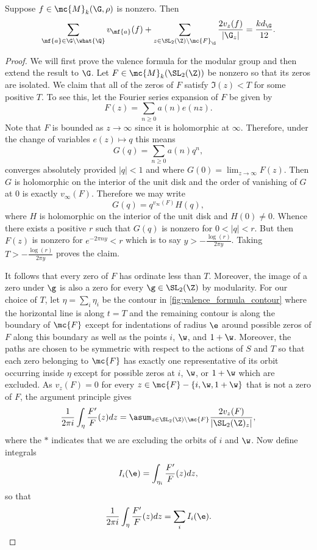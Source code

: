 \documentclass[12pt]{article}
\begin{document}
      \begin{theorem*}
        Suppose \(f \in \mc{M}_{k}(\G,\rho)\) is nonzero. Then
        \[
          \sum_{\mf{a} \in \G\backslash\what{\Q}}v_{\mf{a}}(f)+\sum_{z \in \SL_{2}(\Z)\backslash\mc{F}_{\G}}\frac{2v_{z}(f)}{|\G_{z}|} = \frac{kd_{\G}}{12}.
        \]
      \end{theorem*}
      \begin{proof}
        We will first prove the valence formula for the modular group and then extend the result to \(\G\). Let \(F \in \mc{M}_{k}(\SL_{2}(\Z))\) be nonzero so that its zeros are isolated. We claim that all of the zeros of \(F\) satisfy \(\Im(z) < T\) for some positive \(T\). To see this, let the Fourier series expansion of \(F\) be given by
        \[
          F(z) = \sum_{n \ge 0}a(n)e(nz).
        \]
        Note that \(F\) is bounded as \(z \to \infty\) since it is holomorphic at \(\infty\). Therefore, under the change of variables \(e(z) \mapsto q\) this means
        \[
          G(q) = \sum_{n \ge 0}a(n)q^{n},
        \]
        converges absolutely provided \(|q| < 1\) and where \(G(0) = \lim_{z \to \infty}F(z)\). Then \(G\) is holomorphic on the interior of the unit disk and the order of vanishing of \(G\) at \(0\) is exactly \(v_{\infty}(F)\). Therefore we may write
        \[
          G(q) = q^{v_{\infty}(F)}H(q),
        \]
        where \(H\) is holomorphic on the interior of the unit disk and \(H(0) \neq 0\). Whence there exists a positive \(r\) such that \(G(q)\) is nonzero for \(0 < |q| < r\). But then \(F(z)\) is nonzero for \(e^{-2\pi ny} < r\) which is to say \(y > -\frac{\log(r)}{2\pi y}\). Taking \(T > -\frac{\log(r)}{2\pi y}\) proves the claim.
        
        It follows that every zero of \(F\) has ordinate less than \(T\). Moreover, the image of a zero under \(\g\) is also a zero for every \(\g \in \SL_{2}(\Z)\) by modularity. For our choice of \(T\), let \(\eta = \sum_{i}\eta_{i}\) be the contour in \cref{fig:valence_formula_contour} where the horizontal line is along \(t = T\) and the remaining contour is along the boundary of \(\mc{F}\) except for indentations of radius \(\e\) around possible zeros of \(F\) along this boundary as well as the points \(i\), \(\w\), and \(1+\w\). Moreover, the paths are chosen to be symmetric with respect to the actions of \(S\) and \(T\) so that each zero belonging to \(\mc{F}\) has exactly one representative of its orbit occurring inside \(\eta\) except for possible zeros at \(i\), \(\w\), or \(1+\w\) which are excluded. As \(v_{z}(F) = 0\) for every \(z \in \mc{F}-\{i,\w,1+\w\}\) that is not a zero of \(F\), the argument principle gives
        \[
          \frac{1}{2\pi i}\int_{\eta}\frac{F'}{F}(z)dz = \asum_{z \in \SL_{2}(\Z)\backslash\mc{F}}\frac{2v_{z}(F)}{|\SL_{2}(\Z)_{z}|},
        \]
        where the \(\ast\) indicates that we are excluding the orbits of \(i\) and \(\w\). Now define integrals
        \[
          I_{i}(\e) = \int_{\eta_{i}}\frac{F'}{F}(z)dz,
        \]
        so that
        \[
          \frac{1}{2\pi i}\int_{\eta}\frac{F'}{F}(z)dz = \sum_{i}I_{i}(\e).
        \]


\end{proof}
\end{document}
